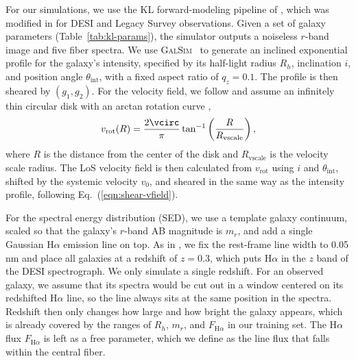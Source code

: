 For our simulations, we use the KL forward-modeling pipeline of \citep{KLInferenceI}, which was modified in \citep{KLDESI} for DESI and Legacy Survey observations. Given a set of galaxy parameters (Table~\ref{tab:kl-params}), the simulator outputs a noiseless $r$-band image and five fiber spectra. We use \textsc{GalSim}~\citep{galsim} to generate an inclined exponential profile for the galaxy's intensity, specified by its half-light radius $R_h$, inclination $i$, and position angle $\theta_\mathrm{int}$, with a fixed aspect ratio of $q_z=0.1$. The profile is then sheared by $(g_1, g_2)$. For the velocity field, we follow \citep{KLDESI} and assume an infinitely thin circular disk with an arctan rotation curve \citep{Courteau97},
\begin{equation}
\label{eqn:vrot}
    v_\mathrm{rot}(R) = \frac{2\vcirc}{\pi}\tan^{-1}\left(\frac{R}{R_\mathrm{vscale}}\right),
\end{equation}
where $R$ is the distance from the center of the disk and $R_\mathrm{vscale}$ is the velocity scale radius. The LoS velocity field is then calculated from $v_\mathrm{rot}$ using $i$ and $\theta_\mathrm{int}$, shifted by the systemic velocity $v_0$, and sheared in the same way as the intensity profile, following Eq.~(\ref{eqn:shear-vfield}).

For the spectral energy distribution (SED), we use a template galaxy continuum, scaled so that the galaxy's $r$-band AB magnitude is $m_r$, and add a single Gaussian H$\alpha$ emission line on top.  As in \citep{KLDESI}, we fix the rest-frame line width to 0.05 nm and place all galaxies at a redshift of $z=0.3$, which puts H$\alpha$ in the $z$ band of the DESI spectrograph. We only simulate a single redshift. For an observed galaxy, we assume that its spectra would be cut out in a window centered on its redshifted H$\alpha$ line, so the line always sits at the same position in the spectra. Redshift then only changes how large and how bright the galaxy appears, which is already covered by the ranges of $R_h$, $m_r$, and $F_{\mathrm{H}\alpha}$ in our training set.  The H$\alpha$ flux $F_{\mathrm{H}\alpha}$ is left as a free parameter, which we define as the line flux that falls within the central fiber.

